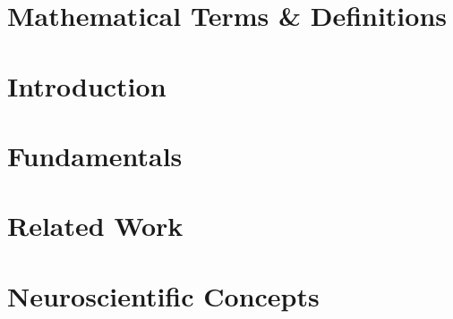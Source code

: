 \documentclass[
    fontsize=10pt,
    twoside=true,
    numbers=noenddot
]{cls/phdbyphd}
\theoremstyle{plain}
\begin{document}
\begingroup

    
    \etocstandarddisplaystyle
    \etocstandardlines

    \tableofcontents

    \listoffigures

    \let\cleardoublepage\bigskip
    \let\clearpage\bigskip

    \listoftables


\endgroup

\chapter*{Mathematical Terms \& Definitions}
	


\mainmatter
{}


\setchapterpreamble[u]{\margintoc}
\chapter{Introduction}


\setchapterpreamble[u]{\margintoc}
\chapter{Fundamentals}


\setchapterpreamble[u]{\margintoc}
\chapter{Related Work}


\setchapterpreamble[u]{\margintoc}
\chapter{Neuroscientific Concepts}


\setchapterpreamble[u]{\margintoc}
\end{document}
